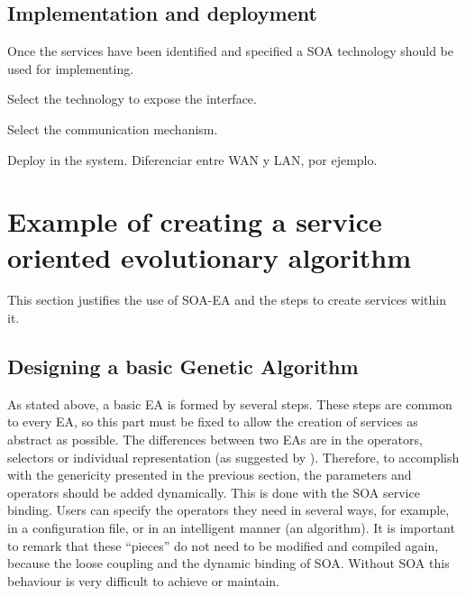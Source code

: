 \subsection{Implementation and deployment}

Once the services have been identified and specified a SOA technology should be used for implementing.

Select the technology to expose the interface.

Select the communication mechanism.

Deploy in the system. Diferenciar entre WAN y LAN, por ejemplo.










\section{Example of creating a service oriented evolutionary algorithm}
This section justifies the use of SOA-EA and the steps to create services within it.

\subsection{Designing a basic Genetic Algorithm}

As  stated above, a basic EA is formed by several steps. These steps are common to every EA, so this part must be fixed  to allow the creation of services as abstract as possible. The differences between two EAs are in the operators, selectors or individual representation (as suggested by  \cite{ParameterTuningEiben2011}).
 Therefore, to accomplish with the genericity presented in the previous section, the parameters and operators should be added dynamically. This is done with the SOA service binding. Users can specify the operators they need in several ways, for example, in a configuration file, or in an intelligent manner (an algorithm). It is important to remark that these ``pieces'' do not need to be modified and compiled again, because the loose coupling and the dynamic binding of SOA. Without SOA this behaviour is very difficult to achieve or maintain.


